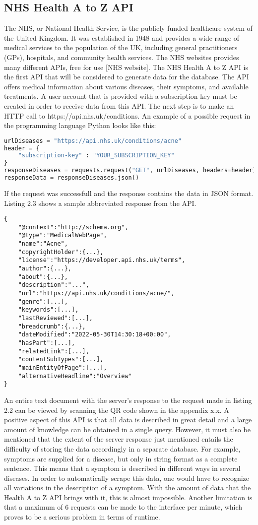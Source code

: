 \subsection{NHS Health A to Z API}
The NHS, or National Health Service, is the publicly funded healthcare system of the United Kingdom. It was established in 1948 and provides a wide range of medical services to the population of the UK, including general practitioners (GPs), hospitals, and community health services. The NHS websites provides many different APIs, free for use [NHS website]. The NHS Health A to Z API is the first API that will be considered to generate data for the database.
The API offers medical information about various diseases, their symptoms, and available treatments. A user account that is provided with a subscription key must be created in order to receive data from this API. The next step is to make an HTTP call to https://api.nhs.uk/conditions. An example of a possible request in the programming language Python looks like this:
\begin{lstlisting}[language=Python, caption={Example Python Request for the Health A to Z API}]
urlDiseases = "https://api.nhs.uk/conditions/acne"
header = {
	"subscription-key" : "YOUR_SUBSCRIPTION_KEY"
}
responseDiseases = requests.request("GET", urlDiseases, headers=header)
responseData = responseDiseases.json()
\end{lstlisting}
If the request was successfull and the response contains the data in JSON format. Listing 2.3 shows a sample abbreviated response from the API.
\begin{lstlisting}[caption={Example Response for the Health A to Z API}]
{
	"@context":"http://schema.org",
	"@type":"MedicalWebPage",
	"name":"Acne",
	"copyrightHolder":{...},
	"license":"https://developer.api.nhs.uk/terms",
	"author":{...},
	"about":{...},
	"description":"...",
	"url":"https://api.nhs.uk/conditions/acne/",
	"genre":[...],
	"keywords":[...],
	"lastReviewed":[...],
	"breadcrumb":{...},
	"dateModified":"2022-05-30T14:30:18+00:00",
	"hasPart":[...],
	"relatedLink":[...],
	"contentSubTypes":[...],
	"mainEntityOfPage":[...],
	"alternativeHeadline":"Overview"
}
\end{lstlisting}
An entire text document with the server's response to the request made in listing 2.2 can be viewed by scanning the QR code shown in the appendix x.x. A positive aspect of this API is that all data is described in great detail and a large amount of knowledge can be obtained in a single query. However, it must also be mentioned that the extent of the server response just mentioned entails the difficulty of storing the data accordingly in a separate database. For example, symptoms are supplied for a disease, but only in string format as a complete sentence. This means that a symptom is described in different ways in several diseases. In order to automatically scrape this data, one would have to recognize all variations in the description of a symptom. With the amount of data that the Health A to Z API brings with it, this is almost impossible. Another limitation is that a maximum of 6 requests can be made to the interface per minute, which proves to be a serious problem in terms of runtime.

